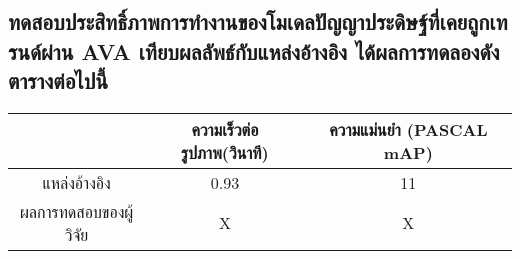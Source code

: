\subsection{ทดสอบประสิทธิ์ภาพการทำงานของโมเดลปัญญาประดิษฐ์ที่เคยถูกเทรนด์ผ่าน AVA เทียบผลลัพธ์กับแหล่งอ้างอิง ได้ผลการทดลองดังตารางต่อไปนี้}
\begin{tabular}{|c|c|c|}
		\hline
		{}&{ความเร็วต่อรูปภาพ(วินาที)}&{ความแม่นยำ (PASCAL mAP)}			\\
		\hline
		แหล่งอ้างอิง	 					& 0.93		& 11														\\
		ผลการทดสอบของผู้วิจัย				& X			& X				\\
		\hline
\end{tabular}
